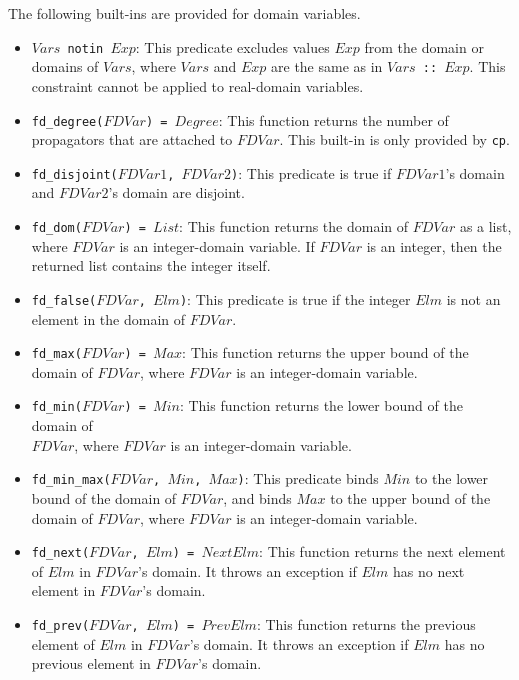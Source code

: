 The following built-ins are provided for domain variables.
\begin{itemize}
\item \texttt{$Vars$ notin $Exp$}: This predicate excludes values $Exp$ from the domain or domains of $Vars$, where $Vars$ and $Exp$ are the same as in \texttt{$Vars$ :: $Exp$}. This constraint cannot be applied to real-domain variables.
\item \texttt{fd\_degree($FDVar$) = $Degree$}: This function returns the number of propagators that are attached to $FDVar$. This built-in is only provided by {\tt cp}.
\item \texttt{fd\_disjoint($FDVar1$, $FDVar2$)}: This predicate is true if $FDVar1$'s domain and $FDVar2$'s domain are disjoint.
\item \texttt{fd\_dom($FDVar$) = $List$}: This function returns the domain of $FDVar$ as a list,  where $FDVar$ is an integer-domain variable. If $FDVar$ is an integer, then the returned list contains the integer itself.
\item \texttt{fd\_false($FDVar$, $Elm$)}: This predicate is true if the integer $Elm$ is not an element in the domain of $FDVar$.
\item \texttt{fd\_max($FDVar$) = $Max$}: This function returns the upper bound of the domain of $FDVar$, where $FDVar$ is an integer-domain variable.
\item \texttt{fd\_min($FDVar$) = $Min$}: This function returns the lower bound of the domain of \\ $FDVar$, where $FDVar$ is an integer-domain variable.
\item \texttt{fd\_min\_max($FDVar$, $Min$, $Max$)}: This predicate binds $Min$ to the lower bound of the domain of $FDVar$, and binds $Max$ to the upper bound of the domain of $FDVar$, where $FDVar$ is an integer-domain variable.
\item \texttt{fd\_next($FDVar$, $Elm$) = $NextElm$}: This function returns the next element of $Elm$ in $FDVar$'s domain. It throws an exception if $Elm$ has no next element in $FDVar$'s domain.
\item \texttt{fd\_prev($FDVar$, $Elm$) = $PrevElm$}: This function returns the previous element of $Elm$ in $FDVar$'s domain. It throws an exception if $Elm$ has no previous element in $FDVar$'s domain.

\end{itemize}
